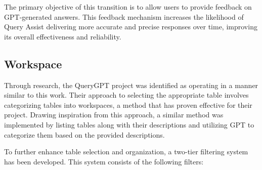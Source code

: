     The primary objective of this transition is to allow users to provide feedback on GPT-generated answers. This feedback mechanism increases the likelihood of Query Assist delivering more accurate and precise responses over time, improving its overall effectiveness and reliability.
    \subsection{Workspace}
    Through research, the QueryGPT project \cite{QueryGPT} was identified as operating in a manner similar to this work. Their approach to selecting the appropriate table involves categorizing tables into workspaces, a method that has proven effective for their project. Drawing inspiration from this approach, a similar method was implemented by listing tables along with their descriptions and utilizing GPT to categorize them based on the provided descriptions.

    To further enhance table selection and organization, a two-tier filtering system has been developed. This system consists of the following filters:

